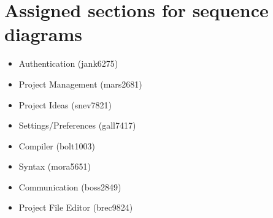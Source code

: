 \documentclass[11pt]{report}
\begin{document}
\section{Assigned sections for sequence diagrams}

\begin{itemize}
    \item Authentication                (jank6275)
    \item Project Management            (mars2681)
    \item Project Ideas                 (snev7821)
    \item Settings/Preferences          (gall7417)
    \item Compiler                      (bolt1003)
    \item Syntax                        (mora5651)
    \item Communication                 (boss2849)
    \item Project File Editor           (brec9824)
\end{itemize}
\end{document}
